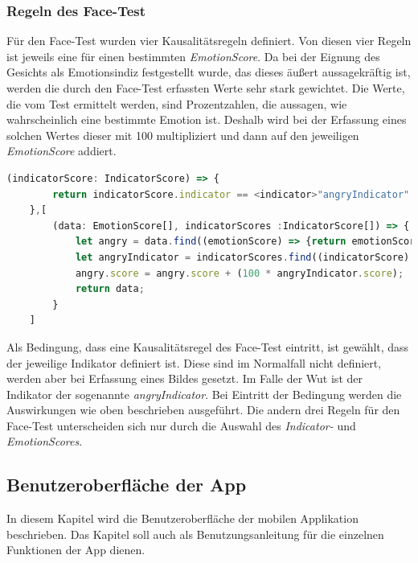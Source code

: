 \subsubsection{Regeln des Face-Test}
Für den Face-Test wurden vier Kausalitätsregeln definiert. Von diesen vier Regeln ist jeweils eine für einen bestimmten \textit{EmotionScore}. Da bei der Eignung des Gesichts als Emotionsindiz festgestellt wurde, das dieses äußert aussagekräftig ist, werden die durch den Face-Test erfassten Werte sehr stark gewichtet. Die Werte, die vom Test ermittelt werden, sind Prozentzahlen, die aussagen, wie wahrscheinlich eine bestimmte Emotion ist. Deshalb wird bei der Erfassung eines solchen Wertes dieser mit 100 multipliziert und dann auf den jeweiligen \textit{EmotionScore} addiert. \newline
\begin{lstlisting}[caption={Kausalitätsregel basierend auf Face-Test für Emotion Wut}, language=JavaScript]
	(indicatorScore: IndicatorScore) => {
		return indicatorScore.indicator == <indicator>"angryIndicator" && indicatorScore.score != undefined;    
	},[
		(data: EmotionScore[], indicatorScores :IndicatorScore[]) => {
			let angry = data.find((emotionScore) => {return emotionScore.emotion == <emotion>"angry"});
			let angryIndicator = indicatorScores.find((indicatorScore) => {return indicatorScore.indicator == <indicator>"angryIndicator"});
			angry.score = angry.score + (100 * angryIndicator.score);
			return data;
		}
	]
\end{lstlisting}
Als Bedingung, dass eine Kausalitätsregel des Face-Test eintritt, ist gewählt, dass der jeweilige Indikator definiert ist. Diese sind im Normalfall nicht definiert, werden aber bei Erfassung eines Bildes gesetzt. Im Falle der Wut ist der Indikator der sogenannte \textit{angryIndicator}. Bei Eintritt der Bedingung werden die Auswirkungen wie oben beschrieben ausgeführt. Die andern drei Regeln für den Face-Test unterscheiden sich nur durch die Auswahl des \textit{Indicator-} und \textit{EmotionScores}. \newline 
\subsection{Benutzeroberfläche der App}
In diesem Kapitel wird die Benutzeroberfläche der mobilen Applikation beschrieben. Das Kapitel soll auch als Benutzungsanleitung für die einzelnen Funktionen der App dienen.
